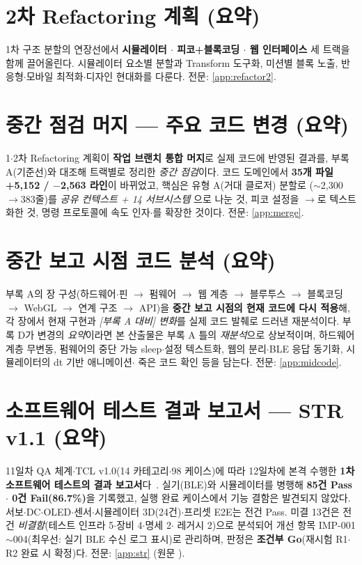 \section{2차 Refactoring 계획 (요약)}
1차 구조 분할의 연장선에서 \textbf{시뮬레이터 $\cdot$ 피코+블록코딩 $\cdot$ 웹 인터페이스}
세 트랙을 함께 끌어올린다. 시뮬레이터 요소별 분할과 Transform 도구화, 미션별 블록
노출, 반응형$\cdot$모바일 최적화$\cdot$디자인 현대화를 다룬다.
\noindent 전문: \ref{app:refactor2}.

\section{중간 점검 머지 --- 주요 코드 변경 (요약)}
1$\cdot$2차 Refactoring 계획이 \textbf{작업 브랜치 통합 머지}로 실제 코드에 반영된 결과를,
부록 A(기준선)와 대조해 트랙별로 정리한 \emph{중간 점검}이다. 코드 도메인에서
\textbf{35개 파일 +5{,}152 / $-$2{,}563 라인}이 바뀌었고, 핵심은 유형 A(거대 클로저)
분할로 ($\sim$2{,}300$\to$383줄)를 \emph{공유 컨텍스트 + 14 서브시스템}
으로 나눈 것, 피코 설정을 $\to$로 텍스트화한
것, 명령 프로토콜에 속도 인자$\cdot$를 확장한 것이다.
\noindent 전문: \ref{app:merge}.

\section{중간 보고 시점 코드 분석 (요약)}
부록 A의 장 구성(하드웨어$\cdot$핀 $\to$ 펌웨어 $\to$ 웹 계층 $\to$ 블루투스 $\to$ 블록코딩
$\to$ WebGL $\to$ 연계 구조 $\to$ API)을 \textbf{중간 보고 시점의 현재 코드에 다시 적용}해,
각 장에서 현재 구현과 \emph{[부록 A 대비] 변화}를 실제 코드 발췌로 드러낸 재분석이다.
부록 D가 변경의 \emph{요약}이라면 본 산출물은 부록 A 틀의 \emph{재분석}으로 상보적이며,
하드웨어 계층 무변동, 펌웨어의 중단 가능 sleep$\cdot$설정 텍스트화, 웹의 
분리$\cdot$BLE 응답 동기화, 시뮬레이터의 dt 기반 애니메이션$\cdot$
죽은 코드 확인 등을 담는다.
\noindent 전문: \ref{app:midcode}.

\section{소프트웨어 테스트 결과 보고서 --- STR v1.1 (요약)}
11일차 QA 체계$\cdot$TCL v1.0(14 카테고리$\cdot$98 케이스)에 따라 12일차에 본격 수행한
\textbf{1차 소프트웨어 테스트의 결과 보고서}다~\cite{iso29119, ieee829, iso25010, beck2003tdd}. 실기(BLE)와 시뮬레이터를 병행해
\textbf{85건 Pass $\cdot$ 0건 Fail(86.7\%)}을 기록했고, 실행 완료 케이스에서 기능 결함은
발견되지 않았다. 서보$\cdot$DC$\cdot$OLED$\cdot$센서$\cdot$시뮬레이터 3D(24건)$\cdot$프리셋
E2E는 전건 Pass. 미결 13건은 전건 \emph{비결함}(테스트 인프라 5$\cdot$장비 4$\cdot$명세 2$\cdot$%
레거시 2)으로 분석되어 개선 항목 IMP-001$\sim$004(최우선: 실기 BLE 수신 로그 표시)로
관리하며, 판정은 \textbf{조건부 Go}(재시험 R1$\cdot$R2 완료 시 확정)다.
\noindent 전문: \ref{app:str} (원문 ).

